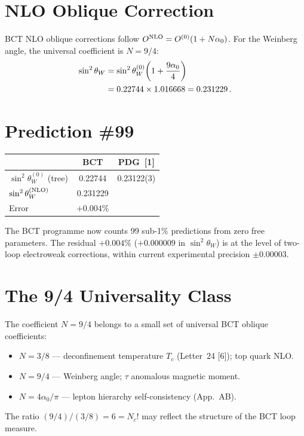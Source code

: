 \documentclass[10pt,twocolumn]{article}
\begin{document}
\section{NLO Oblique Correction}

BCT NLO oblique corrections follow $O^{\rm NLO} = O^{(0)}(1 + N\alpha_0)$. For the Weinberg
angle, the universal coefficient is $N = 9/4$:
\begin{align}
\sin^2\theta_W
  &= \sin^2\theta_W^{(0)}\!\left(1 + \frac{9\alpha_0}{4}\right) \notag\\
  &= 0.22744 \times 1.016668
   = 0.231229\,.
\label{eq:NLO}
\end{align}

\section{Prediction \#99}

\begin{table}[h]
\centering
\small
\begin{tabular}{@{}lcc@{}}
\toprule
 & BCT & PDG~[1] \\
\midrule
$\sin^2\theta_W^{(0)}$ (tree) & 0.22744 & 0.23122(3) \\
$\sin^2\theta_W^{(\rm NLO)}$  & 0.231229 & \\
Error & $+0.004\%$ & \\
\bottomrule
\end{tabular}
\end{table}

The BCT programme now counts 99 sub-1\% predictions from zero free parameters. The residual
$+0.004\%$ ($+0.000009$ in $\sin^2\theta_W$) is at the level of two-loop electroweak corrections,
within current experimental precision $\pm0.00003$.

\section{The 9/4 Universality Class}

The coefficient $N = 9/4$ belongs to a small set of universal BCT oblique coefficients:
\begin{itemize}\setlength\itemsep{1pt}
\item $N = 3/8$ --- deconfinement temperature $T_c$ (Letter~24 [6]); top quark NLO.
\item $N = 9/4$ --- Weinberg angle; $\tau$ anomalous magnetic moment.
\item $N = 4\alpha_0/\pi$ --- lepton hierarchy self-consistency (App.~AB).
\end{itemize}
The ratio $(9/4)/(3/8) = 6 = N_c!$ may reflect the structure of the BCT loop measure.
\end{document}

